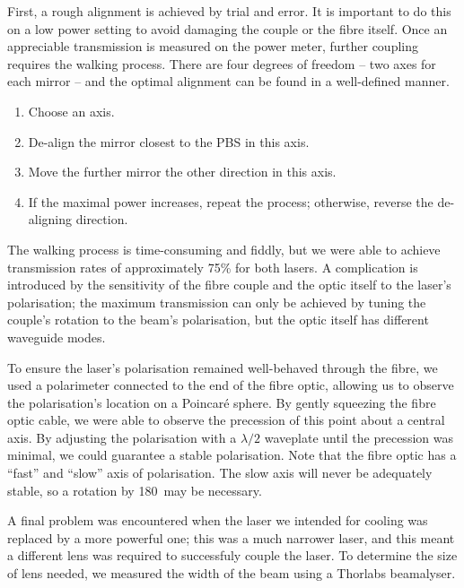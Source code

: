 \documentclass[11pt,twoside,a4paper]{article}
\begin{document}
First, a rough alignment is achieved by trial and error. It is important to do this on a low power setting to avoid damaging the couple or the fibre itself. Once an appreciable transmission is measured
on the power meter, further coupling requires the walking process. There are four degrees of freedom -- two axes for each mirror -- and the optimal alignment can be found in a well-defined manner.
\begin{enumerate}
    \item Choose an axis.
    \item De-align the mirror closest to the PBS in this axis.
    \item Move the further mirror the other direction in this axis.
    \item If the maximal power increases, repeat the process; otherwise, reverse the de-aligning direction.
\end{enumerate}
The walking process is time-consuming and fiddly, but we were able to achieve transmission rates of approximately 75\% for both lasers. A complication is introduced by the sensitivity of the fibre
couple and the optic itself to the laser's polarisation; the maximum transmission can only be achieved by tuning the couple's rotation to the beam's polarisation, but the optic itself has different
waveguide modes.

To ensure the laser's polarisation remained well-behaved through the fibre, we used a polarimeter connected to the end of the fibre optic, allowing us to observe the polarisation's
location on a Poincaré sphere. By gently squeezing the fibre optic cable, we were able to observe the precession of this point about a central axis. By adjusting the polarisation with a \(\lambda/2\)
waveplate until the precession was minimal, we could guarantee a stable polarisation. Note that the fibre optic has a ``fast'' and ``slow'' axis of polarisation. The slow axis will never be adequately
stable, so a rotation by 180\degree~may be necessary.

A final problem was encountered when the laser we intended for cooling was replaced by a more powerful one; this was a much narrower laser, and this meant a different lens was required to successfuly
couple the laser. To determine the size of lens needed, we measured the width of the beam using a Thorlabs beamalyser.
\end{document}
